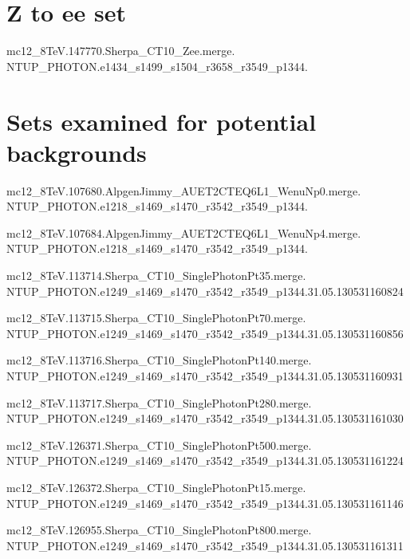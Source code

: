 \section{Z to ee set}\label{ax.zee}

mc12\_8TeV.147770.Sherpa\_CT10\_Zee.merge. \\NTUP\_PHOTON.e1434\_s1499\_s1504\_r3658\_r3549\_p1344.

\section{Sets examined for potential backgrounds}\label{ax.other}
mc12\_8TeV.107680.AlpgenJimmy\_AUET2CTEQ6L1\_WenuNp0.merge. \\NTUP\_PHOTON.e1218\_s1469\_s1470\_r3542\_r3549\_p1344.

mc12\_8TeV.107684.AlpgenJimmy\_AUET2CTEQ6L1\_WenuNp4.merge. \\NTUP\_PHOTON.e1218\_s1469\_s1470\_r3542\_r3549\_p1344.

mc12\_8TeV.113714.Sherpa\_CT10\_SinglePhotonPt35.merge. \\NTUP\_PHOTON.e1249\_s1469\_s1470\_r3542\_r3549\_p1344.31.05.130531160824

mc12\_8TeV.113715.Sherpa\_CT10\_SinglePhotonPt70.merge. \\NTUP\_PHOTON.e1249\_s1469\_s1470\_r3542\_r3549\_p1344.31.05.130531160856

mc12\_8TeV.113716.Sherpa\_CT10\_SinglePhotonPt140.merge. \\NTUP\_PHOTON.e1249\_s1469\_s1470\_r3542\_r3549\_p1344.31.05.130531160931

mc12\_8TeV.113717.Sherpa\_CT10\_SinglePhotonPt280.merge. \\NTUP\_PHOTON.e1249\_s1469\_s1470\_r3542\_r3549\_p1344.31.05.130531161030

mc12\_8TeV.126371.Sherpa\_CT10\_SinglePhotonPt500.merge. \\NTUP\_PHOTON.e1249\_s1469\_s1470\_r3542\_r3549\_p1344.31.05.130531161224

mc12\_8TeV.126372.Sherpa\_CT10\_SinglePhotonPt15.merge. \\NTUP\_PHOTON.e1249\_s1469\_s1470\_r3542\_r3549\_p1344.31.05.130531161146

mc12\_8TeV.126955.Sherpa\_CT10\_SinglePhotonPt800.merge. \\NTUP\_PHOTON.e1249\_s1469\_s1470\_r3542\_r3549\_p1344.31.05.130531161311

